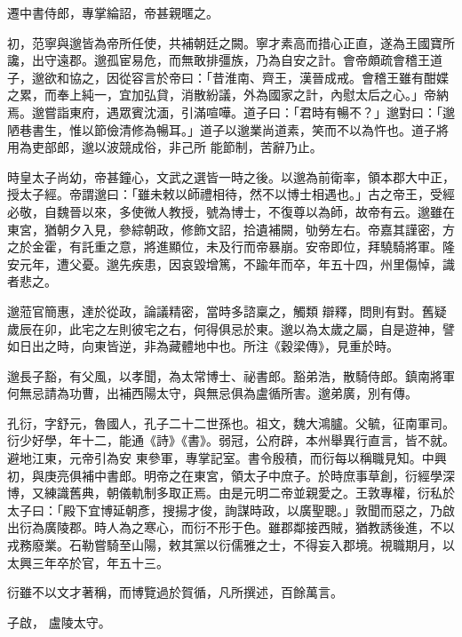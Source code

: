 \begin{pinyinscope}
 遷中書侍郎，專掌綸詔，帝甚親暱之。



 初，范寧與邈皆為帝所任使，共補朝廷之闕。寧才素高而措心正直，遂為王國寶所讒，出守遠郡。邈孤宦易危，而無敢排彊族，乃為自安之計。會帝頗疏會稽王道子，邈欲和協之，因從容言於帝曰：「昔淮南、齊王，漢晉成戒。會稽王雖有酣媟之累，而奉上純一，宜加弘貸，消散紛議，外為國家之計，內慰太后之心。」帝納焉。邈嘗詣東府，遇眾賓沈湎，引滿喧嘩。道子曰：「君時有暢不？」邈對曰：「邈陋巷書生，惟以節儉清修為暢耳。」道子以邈業尚道素，笑而不以為忤也。道子將用為吏部郎，邈以波競成俗，非己所
 能節制，苦辭乃止。



 時皇太子尚幼，帝甚鐘心，文武之選皆一時之後。以邈為前衛率，領本郡大中正，授太子經。帝謂邈曰：「雖未敕以師禮相待，然不以博士相遇也。」古之帝王，受經必敬，自魏晉以來，多使微人教授，號為博士，不復尊以為師，故帝有云。邈雖在東宮，猶朝夕入見，參綜朝政，修飾文詔，拾遺補闕，劬勞左右。帝嘉其謹密，方之於金霍，有託重之意，將進顯位，未及行而帝暴崩。安帝即位，拜驍騎將軍。隆安元年，遭父憂。邈先疾患，因哀毀增篤，不踰年而卒，年五十四，州里傷悼，識者悲之。



 邈蒞官簡惠，達於從政，論議精密，當時多諮稟之，觸類
 辯釋，問則有對。舊疑歲辰在卯，此宅之左則彼宅之右，何得俱忌於東。邈以為太歲之屬，自是遊神，譬如日出之時，向東皆逆，非為藏體地中也。所注《穀梁傳》，見重於時。



 邈長子豁，有父風，以孝聞，為太常博士、祕書郎。豁弟浩，散騎侍郎。鎮南將軍何無忌請為功曹，出補西陽太守，與無忌俱為盧循所害。邈弟廣，別有傳。



 孔衍，字舒元，魯國人，孔子二十二世孫也。祖文，魏大鴻臚。父毓，征南軍司。衍少好學，年十二，能通《詩》《書》。弱冠，公府辟，本州舉異行直言，皆不就。避地江東，元帝引為安
 東參軍，專掌記室。書令殷積，而衍每以稱職見知。中興初，與庚亮俱補中書郎。明帝之在東宮，領太子中庶子。於時庶事草創，衍經學深博，又練識舊典，朝儀軌制多取正焉。由是元明二帝並親愛之。王敦專權，衍私於太子曰：「殿下宜博延朝彥，搜揚才俊，詢謀時政，以廣聖聰。」敦聞而惡之，乃啟出衍為廣陵郡。時人為之寒心，而衍不形于色。雖郡鄰接西賊，猶教誘後進，不以戎務廢業。石勒嘗騎至山陽，敕其黨以衍儒雅之士，不得妄入郡境。視職期月，以太興三年卒於官，年五十三。



 衍雖不以文才著稱，而博覽過於賀循，凡所撰述，百餘萬言。



 子啟，
 盧陵太守。




\end{pinyinscope}
